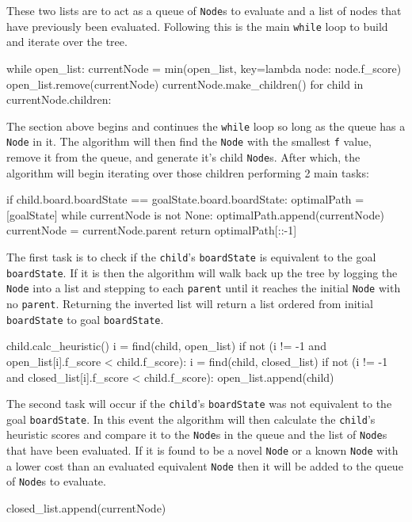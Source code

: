 \documentclass[12pt, letterpaper, final, onecolumn, titlepage] {article}
\begin{document}
\noindent These two lists are to act as a queue of \texttt{Node}s to evaluate and a list of nodes that have previously been evaluated. Following this is the main \texttt{while} loop to build and iterate over the tree.
\vspace{0.4cm}
\begin{python}
while open_list:
    currentNode = min(open_list, key=lambda node: node.f_score)
    open_list.remove(currentNode)
    currentNode.make_children()
    for child in currentNode.children:
\end{python}

\noindent The section above begins and continues the \texttt{while} loop so long as the queue has a \texttt{Node} in it.
The algorithm will then find the \texttt{Node} with the smallest \texttt{f} value, remove it from the queue, and generate it's child \texttt{Node}s.  After which, the algorithm will begin iterating over those children performing 2 main tasks:
\newpage
\begin{python}
if child.board.boardState == goalState.board.boardState:
    optimalPath = [goalState]
    while currentNode is not None:
        optimalPath.append(currentNode)
        currentNode = currentNode.parent
    return optimalPath[::-1]
\end{python}
\noindent The first task is to check if the \texttt{child}'s \texttt{boardState} is equivalent to the goal \texttt{boardState}. 
If it is then the algorithm will walk back up the tree by logging the \texttt{Node} into a list and stepping to each \texttt{parent} until it reaches the initial \texttt{Node} with no \texttt{parent}.  Returning the inverted list will return a list ordered from initial \texttt{boardState} to goal \texttt{boardState}.
\vspace{0.4cm}
\begin{python}
child.calc_heuristic()
i = find(child, open_list)
if not (i != -1 and open_list[i].f_score < child.f_score):
    i = find(child, closed_list)
    if not (i != -1 and closed_list[i].f_score < child.f_score):
        open_list.append(child)
\end{python}

\noindent The second task will occur if the \texttt{child}'s \texttt{boardState} was not equivalent to the goal \texttt{boardState}.
In this event the algorithm will then calculate the \texttt{child}'s heuristic scores and compare it to the \texttt{Node}s in the queue and the list of \texttt{Node}s that have been evaluated.  If it is found to be a novel \texttt{Node} or a known \texttt{Node} with a lower cost than an evaluated equivalent \texttt{Node} then it will be added to the queue of \texttt{Node}s to evaluate. 
\vspace{0.4cm}
\begin{python}
closed_list.append(currentNode)
\end{python}
\end{document}
